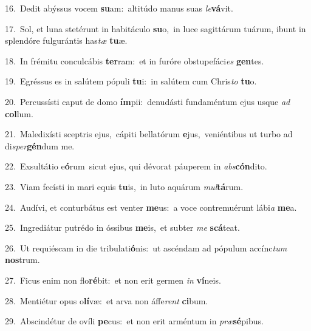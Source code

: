 {\numbfont\textcolor{\numbcolor}{16.}}~Dedit abýssus vocem \textbf{su}\-am:~\star altitúdo manus suas \textit{le}\-\textbf{vá}vit.\par
{\numbfont\textcolor{\numbcolor}{17.}}~Sol, et luna stetérunt in habitáculo \textbf{su}\-o,~\star in luce sagittárum tuárum, ibunt in splendóre fulgurántis has\textit{tæ} \textbf{tu}\-æ.\par
{\numbfont\textcolor{\numbcolor}{18.}}~In frémitu conculcábis \textbf{ter}\-ram:~\star et in furóre obstupefáci\textit{es} \textbf{gen}\-tes.\par
{\numbfont\textcolor{\numbcolor}{19.}}~Egréssus es in salútem pópuli \textbf{tu}\-i:~\star in salútem cum Chris\textit{to} \textbf{tu}\-o.\par
{\numbfont\textcolor{\numbcolor}{20.}}~Percussísti caput de domo \textbf{ím}\-pii:~\star denudásti fundaméntum ejus usque \textit{ad} \textbf{col}\-lum.\par
{\numbfont\textcolor{\numbcolor}{21.}}~Maledixísti sceptris ejus,~\dagger cápiti bellatórum \textbf{e}\-jus,~\star veniéntibus ut turbo ad di\-\textit{sper}\-\textbf{gén}dum me.\par
{\numbfont\textcolor{\numbcolor}{22.}}~Exsultátio e\-\textbf{ó}\-rum~\star sicut ejus, qui dévorat páuperem in \textit{abs}\-\textbf{cón}dito.\par
{\numbfont\textcolor{\numbcolor}{23.}}~Viam fecísti in mari equis \textbf{tu}\-is,~\star in luto aquárum \textit{mul}\-\textbf{tá}rum.\par
{\numbfont\textcolor{\numbcolor}{24.}}~Audívi, et conturbátus est venter \textbf{me}\-us:~\star a voce contremuérunt lábi\textit{a} \textbf{me}\-a.\par
{\numbfont\textcolor{\numbcolor}{25.}}~Ingrediátur putrédo in óssibus \textbf{me}\-is,~\star et subter \textit{me} \textbf{scá}\-teat.\par
{\numbfont\textcolor{\numbcolor}{26.}}~Ut requiéscam in die tribulati\-\textbf{ó}\-nis:~\star ut ascéndam ad pópulum accínc\textit{tum} \textbf{nos}\-trum.\par
{\numbfont\textcolor{\numbcolor}{27.}}~Ficus enim non flo\-\textbf{ré}\-bit:~\star et non erit germen \textit{in} \textbf{ví}\-neis.\par
{\numbfont\textcolor{\numbcolor}{28.}}~Mentiétur opus o\-\textbf{lí}\-væ:~\star et arva non áffe\textit{rent} \textbf{ci}\-bum.\par
{\numbfont\textcolor{\numbcolor}{29.}}~Abscindétur de ovíli \textbf{pe}\-cus:~\star et non erit arméntum in \textit{præ}\-\textbf{sé}pibus.\par
